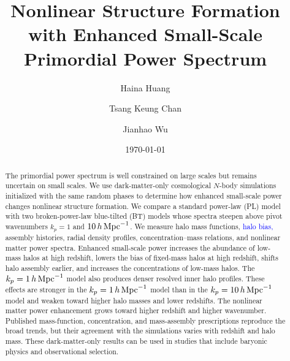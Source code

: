 \documentclass[
 reprint,
 superscriptaddress,
 nofootinbib,
 nobibnotes,
 amsmath,
 amssymb,
 aps,
 prd,
 floatfix,
 longbibliography
]{revtex4-2}
\DeclareRobustCommand{\change}[1]{\textcolor{blue}{#1}}
\begin{document}
\title{Nonlinear Structure Formation with Enhanced Small-Scale Primordial Power Spectrum}

\author{Haina Huang}
\author{Tsang Keung Chan }
\author{Jianhao Wu }

\date{\today}


\begin{abstract}
The primordial power spectrum is well constrained on large scales but remains uncertain on small scales. We use dark-matter-only cosmological \(N\)-body simulations initialized with the same random phases to determine how enhanced small-scale power changes nonlinear structure formation. We compare a standard power-law (PL) model with two broken-power-law blue-tilted (BT) models whose spectra steepen above pivot wavenumbers \(k_p=1\) and \(10\,h\,{\rm Mpc}^{-1}\). We measure halo mass functions, \change{halo bias,} assembly histories, radial density profiles, concentration--mass relations, and nonlinear matter power spectra. Enhanced small-scale power increases the abundance of low-mass halos at high redshift, lowers the bias of fixed-mass halos at high redshift, shifts halo assembly earlier, and increases the concentrations of low-mass halos. The \(k_p=1\,h\,{\rm Mpc}^{-1}\) model also produces denser resolved inner halo profiles. These effects are stronger in the \(k_p=1\,h\,{\rm Mpc}^{-1}\) model than in the \(k_p=10\,h\,{\rm Mpc}^{-1}\) model and weaken toward higher halo masses and lower redshifts. The nonlinear matter power enhancement grows toward higher redshift and higher wavenumber. Published mass-function, concentration, and mass-assembly prescriptions reproduce the broad trends, but their agreement with the simulations varies with redshift and halo mass. These dark-matter-only results can be used in studies that include baryonic physics and observational selection.

\end{abstract}
\end{document}
